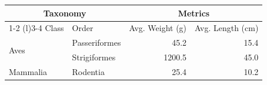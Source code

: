 \documentclass{article}
\begin{document}
\begin{tabular}{llrr}
\toprule
\multicolumn{2}{c}{Taxonomy} & \multicolumn{2}{c}{Metrics} \\
\cmidrule(r){1-2} \cmidrule(l){3-4}
Class & Order & Avg. Weight (g) & Avg. Length (cm) \\
\midrule
\multirow{2}{*}{Aves}      & Passeriformes & 45.2 & 15.4 \\
                           & Strigiformes  & 1200.5 & 45.0 \\
Mammalia                   & Rodentia      & 25.4 & 10.2 \\
\bottomrule
\end{tabular}
\end{document}
